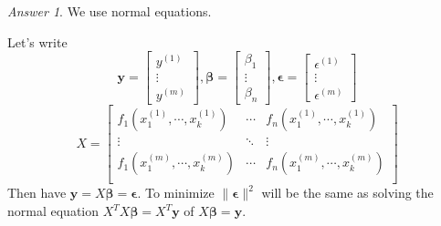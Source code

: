 \documentclass{beamer}
\theoremstyle{definition}
\theoremstyle{remark}
\newtheorem*{answer}{Answer}
\begin{document}
\begin{frame}[t]
\begin{answer}
We use normal equations.
\end{answer}
\pause
Let's write
\[
\mathbf y=\begin{bmatrix}
y^{(1)}\\\vdots\\y^{(m)}
\end{bmatrix},\mathbf \beta=\begin{bmatrix}
\beta_1\\\vdots\\\beta_n
\end{bmatrix},\mathbf \epsilon=\begin{bmatrix}
\epsilon^{(1)}\\\vdots\\\epsilon^{(m)}
\end{bmatrix}
\]
\[
X=\begin{bmatrix}
f_1(x_1^{(1)},\cdots,x_k^{(1)})&\cdots&f_n(x_1^{(1)},\cdots,x_k^{(1)})\\
\vdots&\ddots&\vdots\\
f_1(x_1^{(m)},\cdots,x_k^{(m)})&\cdots&f_n(x_1^{(m)},\cdots,x_k^{(m)})\\
\end{bmatrix}
\]\pause
Then have $\mathbf y=X\mathbf\beta=\mathbf\epsilon$. To minimize $\|\mathbf\epsilon\|^2$ will be the same as solving the normal equation $X^TX\mathbf\beta=X^T\mathbf y$ of $X\mathbf\beta=\mathbf y$.
\end{frame}

\end{document}
